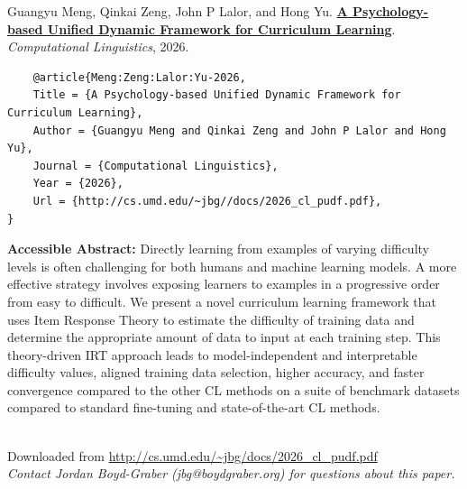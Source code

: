 \documentclass[a4paper]{article}
\begin{document}
    Guangyu Meng, Qinkai Zeng, John P Lalor, and Hong Yu.  {\bf \href{http://cs.umd.edu/~jbg//docs/2026_cl_pudf.pdf}{A Psychology-based Unified Dynamic Framework for Curriculum Learning}}.  \emph{Computational Linguistics}, 2026.



    \vspace{5cm}

    \begin{verbatim}
    @article{Meng:Zeng:Lalor:Yu-2026,
	Title = {A Psychology-based Unified Dynamic Framework for Curriculum Learning},
	Author = {Guangyu Meng and Qinkai Zeng and John P Lalor and Hong Yu},
	Journal = {Computational Linguistics},
	Year = {2026},
	Url = {http://cs.umd.edu/~jbg//docs/2026_cl_pudf.pdf},
}

    \end{verbatim}

    {\bf Accessible Abstract:} Directly learning from examples of varying difficulty levels is often challenging for both humans and machine learning models. A more effective strategy involves exposing learners to examples in a progressive order from easy to difficult. We present a novel curriculum learning framework that uses Item Response Theory to estimate the difficulty of training data and determine the appropriate amount of data to input at each training step. This theory-driven IRT approach leads to model-independent and interpretable difficulty values, aligned training data selection, higher accuracy, and faster convergence compared to the other CL methods on a suite of benchmark datasets compared to standard fine-tuning and state-of-the-art CL methods.\\~

    

    

    \vspace{3cm}
    Downloaded from \url{http://cs.umd.edu/~jbg/docs/2026_cl_pudf.pdf}  \\

    \vspace{2cm}
    \textit{Contact Jordan Boyd-Graber (jbg@boydgraber.org) for questions about this paper.}

    

    
\end{document}
